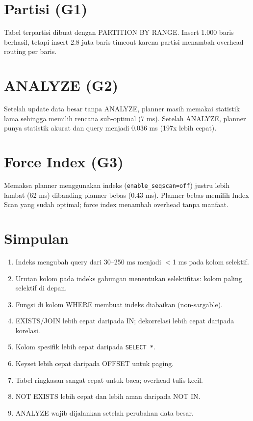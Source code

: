 
\section{Partisi (G1)}
Tabel terpartisi dibuat dengan PARTITION BY RANGE. Insert 1.000 baris berhasil, tetapi insert 2.8 juta baris timeout karena partisi menambah overhead routing per baris.


\section{ANALYZE (G2)}
Setelah update data besar tanpa ANALYZE, planner masih memakai statistik lama sehingga memilih rencana sub-optimal (7 ms). Setelah ANALYZE, planner punya statistik akurat dan query menjadi 0.036 ms (197x lebih cepat).


\section{Force Index (G3)}
Memaksa planner menggunakan indeks (\texttt{enable\_seqscan=off}) justru lebih lambat (62 ms) dibanding planner bebas (0.43 ms). Planner bebas memilih Index Scan yang sudah optimal; force index menambah overhead tanpa manfaat.


\section{Simpulan}
\begin{enumerate}
  \item Indeks mengubah query dari 30--250 ms menjadi $<$1 ms pada kolom selektif.
  \item Urutan kolom pada indeks gabungan menentukan selektifitas: kolom paling selektif di depan.
  \item Fungsi di kolom WHERE membuat indeks diabaikan (non-sargable).
  \item EXISTS/JOIN lebih cepat daripada IN; dekorrelasi lebih cepat daripada korelasi.
  \item Kolom spesifik lebih cepat daripada \texttt{SELECT *}.
  \item Keyset lebih cepat daripada OFFSET untuk paging.
  \item Tabel ringkasan sangat cepat untuk baca; overhead tulis kecil.
  \item NOT EXISTS lebih cepat dan lebih aman daripada NOT IN.
  \item ANALYZE wajib dijalankan setelah perubahan data besar.
\end{enumerate}
